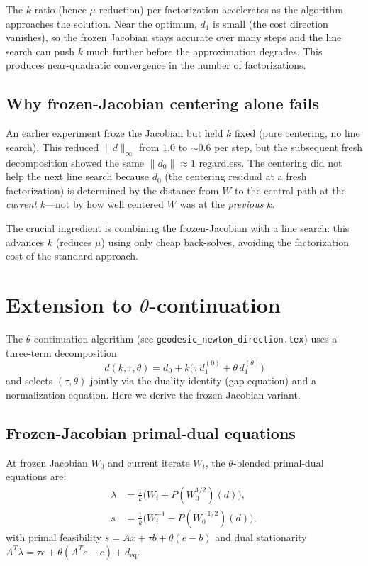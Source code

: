 \documentclass{article}
\begin{document}
The $k$-ratio (hence $\mu$-reduction) per factorization accelerates as
the algorithm approaches the solution.  Near the optimum, $d_1$ is small
(the cost direction vanishes), so the frozen Jacobian stays accurate over
many steps and the line search can push $k$ much further before the
approximation degrades.  This produces near-quadratic convergence in
the number of factorizations.

\subsection{Why frozen-Jacobian centering alone fails}

An earlier experiment froze the Jacobian but held $k$ fixed (pure
centering, no line search).  This reduced $\|d\|_\infty$ from $1.0$
to $\sim 0.6$ per step, but the subsequent fresh decomposition showed
the same $\|d_0\| \approx 1$ regardless.  The centering did not help
the next line search because $d_0$ (the centering residual at a fresh
factorization) is determined by the distance from $W$ to the central
path at the \emph{current} $k$---not by how well centered $W$ was at
the \emph{previous} $k$.

The crucial ingredient is combining the frozen-Jacobian with a line
search: this advances $k$ (reduces $\mu$) using only cheap back-solves,
avoiding the factorization cost of the standard approach.

\section{Extension to $\theta$-continuation}

The $\theta$-continuation algorithm (see \texttt{geodesic\_newton\_direction.tex})
uses a three-term decomposition
\[
  d(k,\tau,\theta) = d_0 + k\bigl(\tau\,d_1^{(0)} + \theta\,d_1^{(\theta)}\bigr)
\]
and selects $(\tau, \theta)$ jointly via the duality identity (gap equation)
and a normalization equation.  Here we derive the frozen-Jacobian variant.

\subsection{Frozen-Jacobian primal-dual equations}

At frozen Jacobian $W_0$ and current iterate $W_i$, the $\theta$-blended
primal-dual equations are:
\begin{align}
  \lambda &= \frac{1}{k}\bigl(W_i + P(W_0^{1/2})(d)\bigr),
    \label{eq:lam-frozen-theta} \\
  s &= \frac{1}{k}\bigl(W_i^{-1} - P(W_0^{-1/2})(d)\bigr),
    \label{eq:s-frozen-theta}
\end{align}
with primal feasibility $s = Ax + \tau b + \theta(e - b)$ and dual
stationarity $A^T\lambda = \tau c + \theta(A^T e - c) + d_{\text{eq}}$.
\end{document}
